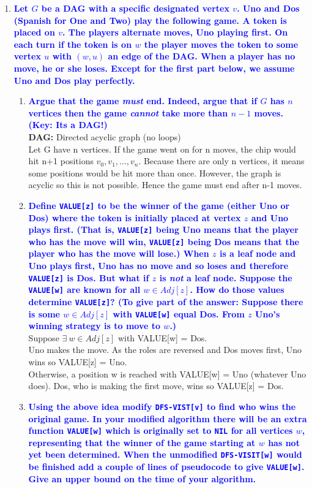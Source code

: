 \documentclass[11pt]{article}
\begin{document}
\begin{enumerate}
\item \textbf{\textcolor{blue}{Let $G$ be a DAG with a specific designated vertex $v$. Uno and Dos (Spanish for One and Two) play the following game. A token is placed on $v$.  The players alternate moves, Uno playing first.  On each turn if the token is on $w$ the player moves the token to some vertex $u$ with $(w,u)$ an edge of the DAG. When a player has no move, he or she loses. Except for the first part below, we assume Uno and Dos play perfectly.}}
\begin{enumerate}
    \item \textbf{\textcolor{blue}{Argue that the game {\em must} end. Indeed, argue that if     $G$ has $n$ vertices then the game {\em cannot} take more than $n-1$ moves. (Key: Its a DAG!)}}
        \\ \textbf{DAG:} Directed acyclic graph (no loops)
        \\ Let G have n vertices. If the game went on for n moves, the chip would hit n+1 positions $v_0, v_1, ..., v_n$. Because there are only n vertices, it means some positions would be hit more than once. However, the graph is acyclic so this is not possible. Hence the game must end after n-1 moves.
    \item \textbf{\textcolor{blue}{Define {\tt VALUE[z]} to be the winner of the game (either Uno or Dos) where the token is initially placed at vertex $z$ and Uno plays first. (That is, {\tt VALUE[z]} being Uno means that the player who has the move will win, {\tt VALUE[z]} being Dos means that the player who has the move will lose.) When $z$ is a leaf node and Uno plays first, Uno has no move and so loses and therefore {\tt VALUE[z]} is Dos.  But what if $z$ is {\em not} a leaf node. Suppose the {\tt VALUE[w]} are known for all $w\in Adj[z]$. How do those values determine {\tt VALUE[z]}? (To give part of the answer: Suppose there is some $w\in Adj[z]$ with {\tt VALUE[w]} equal Dos. From $z$ Uno's winning strategy is to move to $w$.)}}
        \\ Suppose $\exists \ w \in Adj[z]$ with VALUE[w] = Dos.
        \\ Uno makes the move. As the roles are reversed and Dos moves first, Uno wins so VALUE[z] = Uno.
        \\ Otherwise, a position w is reached with VALUE[w] = Uno (whatever Uno does). Dos, who is making the first move, wins so VALUE[z] = Dos.
    \item \textbf{\textcolor{blue}{Using the above idea modify {\tt DFS-VIST[v]} to find who wins the original game.  In your modified algorithm there will be an extra function {\tt VALUE[w]} which is originally set to {\tt NIL} for all vertices $w$, representing that the winner of the game starting at $w$ has not yet been determined. When the unmodified {\tt DFS-VISIT[w]} would be finished add a couple of lines of pseudocode to give {\tt VALUE[w]}. Give an upper bound on the time of your algorithm.}}

\end{enumerate}
\end{enumerate}
\end{document}
